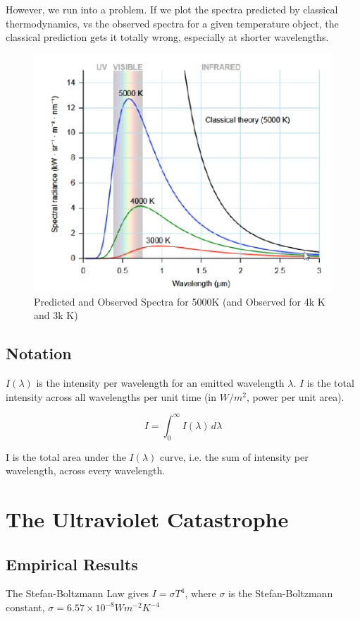 However, we run into a problem. If we plot the spectra predicted by classical thermodynamics, vs the observed spectra for a given temperature object, the classical prediction gets it totally wrong, especially at shorter wavelengths.

\begin{figure}[H]
    \centering
    \includegraphics{figures/lec02-02.png}
     \caption{Predicted and Observed Spectra for 5000K (and Observed for 4k K and 3k K)}
\end{figure}

\subsection*{Notation}
$I(\lambda)$ is the intensity per wavelength for an emitted wavelength $\lambda$. $I$ is the total intensity across all wavelengths per unit time (in $W/m^2$, power per unit area).

\[
    I = \int_{0}^{\infty} I(\lambda) \, d \lambda
\]

I is the total area under the $I(\lambda)$ curve, i.e. the sum of intensity per wavelength, across every wavelength.

\section*{The Ultraviolet Catastrophe}
\subsection*{Empirical Results}
The Stefan-Boltzmann Law gives $I = \sigma T^4$, where $\sigma$ is the Stefan-Boltzmann constant, $\sigma = 6.57 \times 10^{-8} W m^{-2} K^{-4}$

